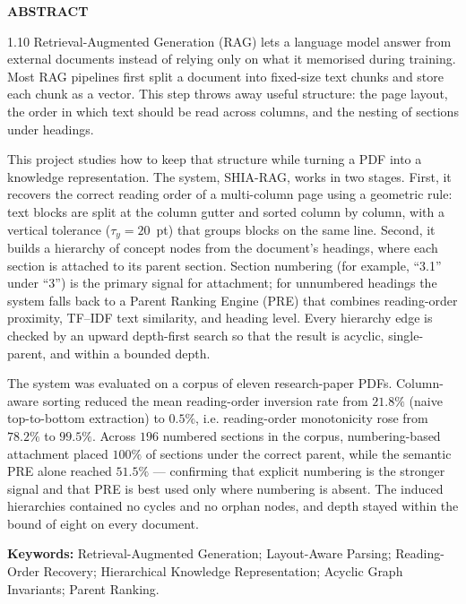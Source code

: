 \documentclass[12pt,a4paper]{report}
\begin{document}
\setcounter{page}{1}
\begin{center}{\Large\bfseries ABSTRACT}\end{center}
\vspace{2mm}
\begin{spacing}{1.10}
\noindent
Retrieval-Augmented Generation (RAG) lets a language model answer from external
documents instead of relying only on what it memorised during training. Most RAG
pipelines first split a document into fixed-size text chunks and store each chunk as a
vector. This step throws away useful structure: the page layout, the order in which
text should be read across columns, and the nesting of sections under headings.

This project studies how to keep that structure while turning a PDF into a knowledge
representation. The system, SHIA-RAG, works in two stages. First, it recovers the
correct reading order of a multi-column page using a geometric rule: text blocks are
split at the column gutter and sorted column by column, with a vertical tolerance
($\tau_y = 20$~pt) that groups blocks on the same line. Second, it builds a hierarchy
of concept nodes from the document's headings, where each section is attached to its
parent section. Section numbering (for example, ``3.1'' under ``3'') is the primary
signal for attachment; for unnumbered headings the system falls back to a Parent
Ranking Engine (PRE) that combines reading-order proximity, TF--IDF text similarity,
and heading level. Every hierarchy edge is checked by an upward depth-first search so
that the result is acyclic, single-parent, and within a bounded depth.

The system was evaluated on a corpus of eleven research-paper PDFs. Column-aware
sorting reduced the mean reading-order inversion rate from $21.8\%$ (naive top-to-bottom
extraction) to $0.5\%$, i.e. reading-order monotonicity rose from $78.2\%$ to $99.5\%$.
Across $196$ numbered sections in the corpus, numbering-based attachment placed
$100\%$ of sections under the correct parent, while the semantic PRE alone reached
$51.5\%$ --- confirming that explicit numbering is the stronger signal and that PRE is
best used only where numbering is absent. The induced hierarchies contained no cycles
and no orphan nodes, and depth stayed within the bound of eight on every document.

\vspace{3mm}
\noindent\textbf{Keywords:} Retrieval-Augmented Generation; Layout-Aware Parsing;
Reading-Order Recovery; Hierarchical Knowledge Representation; Acyclic Graph
Invariants; Parent Ranking.
\end{spacing}
\clearpage
\end{document}
